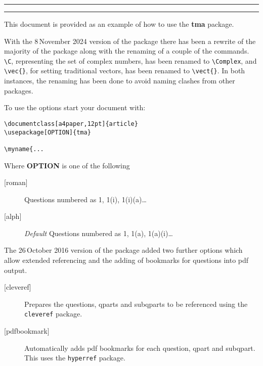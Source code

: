 \documentclass[a4paper,12pt]{article}
\begin{document}
\maketitle

\hfill{}

\begin{center}
\begin{minipage}{0.9\linewidth}
\rule[0.4pt-1em]{0.4pt}{1em}\hrulefill\rule[0.4pt-1em]{0.4pt}{1em}\vskip 10pt

This document is provided as an example of how to use the \textbf{tma} package.

With the 8\nth\,November 2024 version of the package there has been a rewrite of
the majority of the package along with the renaming of a couple of the commands.
\verb|\C|, representing the set of complex numbers, has been renamed to \verb|\Complex|,
and \verb|\vec{}|, for setting traditional vectors, has been renamed to \verb|\vect{}|.
In both instances, the renaming has been done to avoid naming clashes from other packages.

To use the options start your document with:
\begin{verbatim}
\documentclass[a4paper,12pt]{article}
\usepackage[OPTION]{tma}

\myname{...
\end{verbatim}

Where \textbf{OPTION} is one of the following
\begin{description}
  \item[{[}roman{]}] Questions numbered as 1, 1(i), 1(i)(a)\dots
  \item[{[}alph{]}] \emph{Default} Questions numbered as 1, 1(a), 1(a)(i)\dots
\end{description}

The 26\nth\,October 2016 version of the package added two further options which allow extended referencing and the adding of
bookmarks for questions into pdf output.

\begin{description}
  \item[{[}cleveref{]}] Prepares the questions, qparts and subqparts to be referenced using the \verb|cleveref| package.
  \item[{[}pdfbookmark{]}] Automatically adds pdf bookmarks for each question, qpart and subqpart. This uses the \verb|hyperref| package.
\end{description}


\end{minipage}
\end{center}
\end{document}
